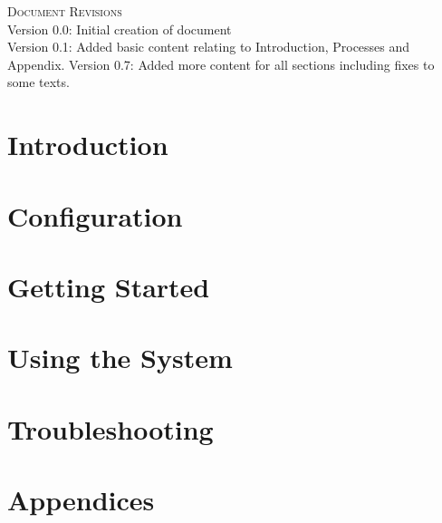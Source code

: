 \documentclass[a4paper,12pt]{report}
\begin{document}
\renewcommand{\thesection}{\arabic{section}}
\newpage
\tableofcontents{}
\newpage
\begin{center}
\textsc{\LARGE Document Revisions}\\[1.5cm]
 Version 0.0: Initial creation of document \\
 Version 0.1: Added basic content relating to Introduction, Processes and Appendix.
  Version 0.7: Added more content for all sections including fixes to some texts.

 
\end{center}
\newpage
\section{Introduction}
	
	\section{Configuration}
	
\section{Getting Started}
	
	\section{Using the System}
	
	\section{Troubleshooting}
	
\section{Appendices}
	
\end{document}
